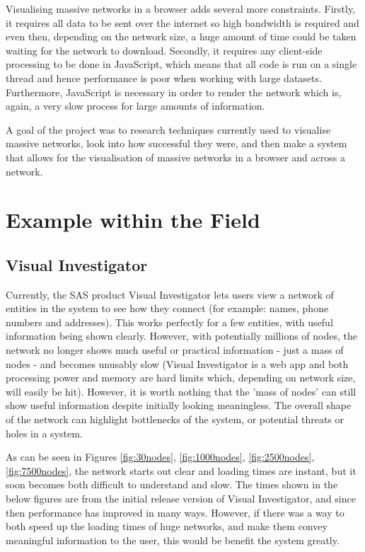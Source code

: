 \documentclass[../dissertation.tex]{subfiles}
\begin{document}
Visualising massive networks in a browser adds several more constraints. Firstly, it requires all data to be sent over the internet so high bandwidth is required and even then, depending on the network size, a huge amount of time could be taken waiting for the network to download. Secondly, it requires any client-side processing to be done in JavaScript, which means that all code is run on a single thread and hence performance is poor when working with large datasets. Furthermore, JavaScript is necessary in order to render the network which is, again, a very slow process for large amounts of information. 

A goal of the project was to research techniques currently used to visualise massive networks, look into how successful they were, and then make a system that allows for the visualisation of massive networks in a browser and across a network. 

\section{Example within the Field}

\subsection{Visual Investigator}

Currently, the SAS product Visual Investigator \cite{sasvi} lets users view a network of entities in the system to see how they connect (for example: names, phone numbers and addresses). This works perfectly for a few entities, with useful information being shown clearly. However, with potentially millions of nodes, the network no longer shows much useful or practical information - just a mass of nodes - and becomes unusably slow (Visual Investigator is a web app and both processing power and memory are hard limits which, depending on network size, will easily be hit). However, it is worth nothing that the 'mass of nodes' can still show useful information despite initially looking meaningless. The overall shape of the network can highlight bottlenecks of the system, or potential threats or holes in a system.

As can be seen in Figures \ref{fig:30nodes}, \ref{fig:1000nodes}, \ref{fig:2500nodes}, \ref{fig:7500nodes}, the network starts out clear and loading times are instant, but it soon becomes both difficult to understand and slow. The times shown in the below figures are from the initial release version of Visual Investigator, and since then performance has improved in many ways. However, if there was a way to both speed up the loading times of huge networks, and make them convey meaningful information to the user, this would be benefit the system greatly.
\end{document}
